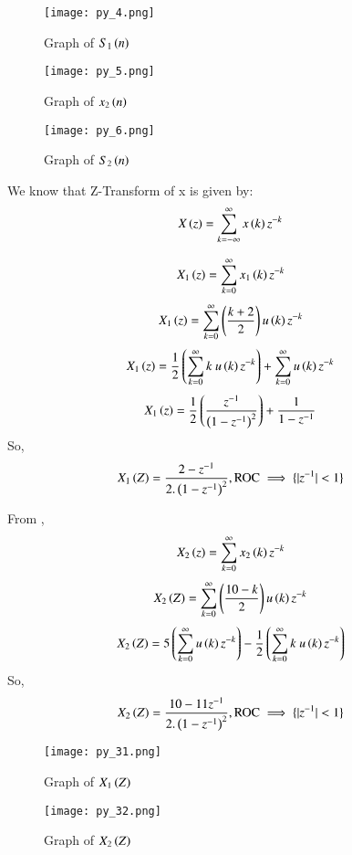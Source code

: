 \documentclass[beamer]{IEEEtran}
\theoremstyle{remark}
\begin{document}
\begin{figure}[h]
    \centering
    \texttt{[image: py\_4.png]}
    \label{fig:s1n}
    \caption*{Graph of $S_1\left(n\right)$}
\end{figure}

\begin{figure}[h]
    \centering
    \texttt{[image: py\_5.png]}
    \label{fig:x2n}
    \caption*{Graph of $x_2\left(n\right)$}
\end{figure}

\begin{figure}[h]
    \centering
    \texttt{[image: py\_6.png]}
    \label{s2n}
    \caption*{Graph of $S_2\left(n\right)$}
\end{figure}
We know that Z-Transform of x is given by:
\begin{align}
\label{q11}
    X\left(z\right)&=\sum_{k=-\infty}^{\infty} x\left(k\right)z^{-k}
\end{align}

\begin{align}
\label{q12}
    X_1\left(z\right)&=\sum_{k=0}^{\infty} x_1\left(k\right)z^{-k}
\end{align}
\begin{align}X_1\left(z\right)&=\sum_{k=0}^{\infty} \left(\frac{k+2}{2}\right)u\left(k\right)z^{-k}\end{align}
\begin{align}
    \label{q13}
    X_1\brak{z}&=\frac{1}{2}\brak{\sum_{k=0}^{\infty}k\ u\brak{k}z^{-k}}+\sum_{k=0}^{\infty}u\brak{k}z^{-k}
\end{align}
\begin{align}
    \label{q13}
    X_1\left(z\right)&=\frac{1}{2}\left(\frac{z^{-1}}{\left(1-z^{-1}\right)^2}\right)+\frac{1}{1-z^{-1}}
\end{align}
So,
\begin{align} X_1\left(Z\right)&=\frac{2-z^{-1}}{2.\left(1-z^{-1}\right)^2},\text{ROC}\implies\{|z^{-1}|<1\}\end{align}

From \brak{\ref{q12}},
\begin{align}
    X_2\left(z\right)&=\sum_{k=0}^{\infty} x_2\left(k\right)z^{-k}
\end{align}
\begin{align}X_2\left(Z\right)&=\sum_{k=0}^{\infty} \left(\frac{10-k}{2}\right)u\left(k\right)z^{-k}\end{align}
\begin{align}X_2\brak{Z}&=5\brak{\sum_{k=0}^{\infty}u\brak{k}z^{-k}}-\frac{1}{2}\brak{\sum_{k=0}^{\infty}k\ u\brak{k}z^{-k}}\end{align}
So,
\begin{align}X_2\left(Z\right)&=\frac{10-11z^{-1}}{2.\left(1-z^{-1}\right)^2},\text{ROC}\implies\{|z^{-1}|<1\}\end{align}
\begin{figure}[h]
    \centering
    \texttt{[image: py\_31.png]}
    \label{fig:x1z}
    \caption*{Graph of $X_1\left(Z\right)$}
\end{figure}
\begin{figure}[h]
    \centering
    \texttt{[image: py\_32.png]}
    \label{x2z}
    \caption*{Graph of $X_2\left(Z\right)$}
\end{figure}
\end{document}
